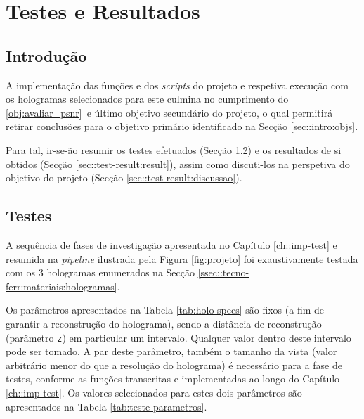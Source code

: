 \chapter{Testes e Resultados}
\label{ch::test-result}

\section{Introdução}
\label{sec::test-result:intro}

A implementação das funções e dos \textit{scripts} do projeto e respetiva execução com os hologramas selecionados para este culmina no cumprimento do \ref{obj:avaliar_psnr}\textordmasculine~e último objetivo secundário do projeto, o qual permitirá retirar conclusões para o objetivo primário identificado na Secção \ref{sec::intro:objs}.

Para tal, ir-se-ão resumir os testes efetuados (Secção \ref{sec::test-result:test}) e os resultados de si obtidos (Secção \ref{sec::test-result:result}), assim como discuti-los na perspetiva do objetivo do projeto (Secção \ref{sec::test-result:discussao}).


\section{Testes}
\label{sec::test-result:test}

A sequência de fases de investigação apresentada no Capítulo \ref{ch::imp-test} e resumida na \textit{pipeline} ilustrada pela Figura \ref{fig:projeto} foi exaustivamente testada com os 3 hologramas enumerados na Secção \ref{ssec::tecno-ferr:materiais:hologramas}.

Os parâmetros apresentados na Tabela \ref{tab:holo-specs} são fixos (a fim de garantir a reconstrução do holograma), sendo a distância de reconstrução (parâmetro \verb|z|) em particular um intervalo. Qualquer valor dentro deste intervalo pode ser tomado. A par deste parâmetro, também o tamanho da vista (valor arbitrário menor do que a resolução do holograma) é necessário para a fase de testes, conforme as funções transcritas e implementadas ao longo do Capítulo \ref{ch::imp-test}. Os valores selecionados para estes dois parâmetros são apresentados na Tabela \ref{tab:teste-parametros}.

